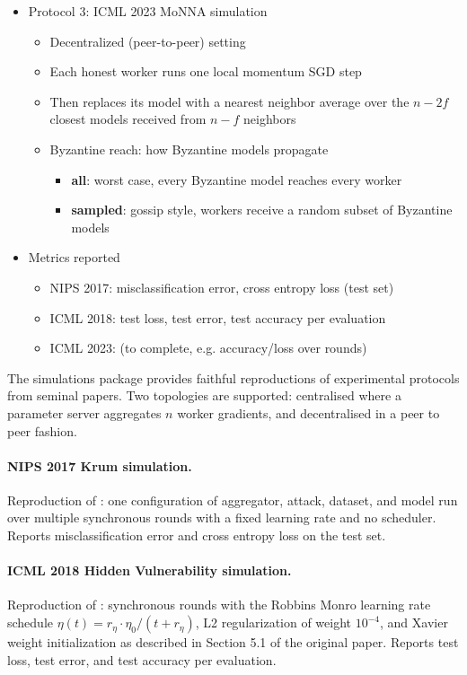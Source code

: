 \documentclass[twoside,11pt]{article}
\begin{document}
{\begin{itemize}
\begin{itemize}
    \end{itemize}
    \item Protocol 3: ICML 2023 MoNNA simulation \citep{farhadkhani2023monna}
    \begin{itemize}
        \item Decentralized (peer-to-peer) setting
        \item Each honest worker runs one local momentum SGD step
        \item Then replaces its model with a nearest neighbor average over the $n - 2f$ closest models received from $n - f$ neighbors
        \item Byzantine reach: how Byzantine models propagate
        \begin{itemize}
            \item \textbf{all}: worst case, every Byzantine model reaches every worker
            \item \textbf{sampled}: gossip style, workers receive a random subset of Byzantine models
        \end{itemize}
    \end{itemize}
    \item Metrics reported
    \begin{itemize}
        \item NIPS 2017: misclassification error, cross entropy loss (test set)
        \item ICML 2018: test loss, test error, test accuracy per evaluation
        \item ICML 2023: (to complete, e.g. accuracy/loss over rounds)
    \end{itemize}
\end{itemize}
}

The simulations package provides faithful reproductions of experimental protocols from seminal papers. Two topologies are supported: centralised where a parameter server aggregates $n$ worker gradients, and decentralised in a peer to peer fashion.

\paragraph{NIPS 2017 Krum simulation.}
Reproduction of \citet{blanchard2017machine}: one configuration of aggregator, attack, dataset, and model run over multiple synchronous rounds with a fixed learning rate and no scheduler. Reports misclassification error and cross entropy loss on the test set.

\paragraph{ICML 2018 Hidden Vulnerability simulation.}
Reproduction of \citet{elmhamdi2018hidden}: synchronous rounds with the Robbins Monro learning rate schedule $\eta(t) = r_\eta \cdot \eta_0 / (t + r_\eta)$, L2 regularization of weight $10^{-4}$, and Xavier weight initialization as described in Section 5.1 of the original paper. Reports test loss, test error, and test accuracy per evaluation.
\end{document}
